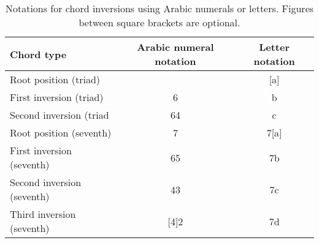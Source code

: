 \begin{table}[]
    \begin{tabular}{l|c|c}
    Chord type & Arabic numeral notation & Letter notation
    \\ \hline
    Root position (triad) &  & [a] \\
    First inversion (triad) & 6 & b \\
    Second inversion (triad & 64 & c \\
    Root position (seventh) & 7 & 7[a] \\
    First inversion (seventh) & 65 & 7b \\
    Second inversion (seventh) & 43 & 7c \\
    Third inversion (seventh) & [4]2 & 7d
    \end{tabular}
    \caption{Notations for chord inversions using Arabic numerals or letters. Figures between square brackets are optional.}
    \label{tab:inversions}
\end{table}
